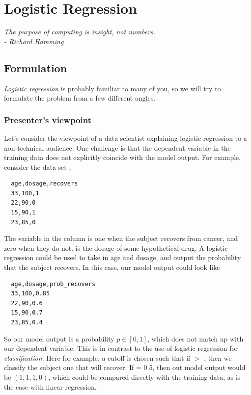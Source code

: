 \chapter{Logistic Regression}
\label{chapter:logistic}
\begin{center}
  {\Large\textit{The purpose of computing is insight, not numbers.\\- Richard Hamming}}
\end{center}
\vspace{0.2in}

\section{Formulation}

\emph{Logistic regression} is probably familiar to many of you, so we will try to formulate the problem from a few different angles.  

\subsection{Presenter's viewpoint}
Let's consider the viewpoint of a data scientist explaining logistic regression to a non-technical audience.  One challenge is that the dependent variable in the training data does not explicitly coincide with the model output.  For example, consider the data set ,

\begin{verbatim}
  age,dosage,recovers
  33,100,1
  22,90,0
  15,90,1
  23,85,0
\end{verbatim}

The variable in the column  is one when the subject recovers from cancer, and zero when they do not.   is the dosage of some hypothetical drug.  A logistic regression could be used to take in age and dosage, and output the probability that the subject recovers.  In this case, our model output could look like

\begin{verbatim}
  age,dosage,prob_recovers
  33,100,0.85
  22,90,0.6
  15,90,0.7
  23,85,0.4
\end{verbatim}

So our model output is a probability $p\in[0,1]$, which does not match up with our dependent variable.  This is in contrast to the use of logistic regression for \emph{classification}.  Here for example, a cutoff is chosen such that if  $ > $ , then we classify the subject one that will recover.  If  = 0.5, then out model output would be $(1, 1, 1, 0)$, which could be compared directly with the training data, as is the case with linear regression.

